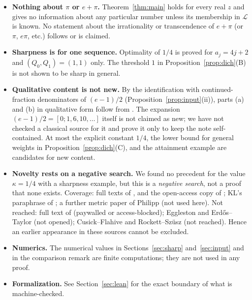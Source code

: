 \documentclass[11pt]{amsart}
\theoremstyle{remark}
\newcommand{\LL}{\mathcal{L}}
\begin{document}
\begin{itemize}
\item \textbf{Nothing about $\pi$ or $e+\pi$.} Theorem~\ref{thm:main} holds for every real $z$ and gives no
information about any particular number unless its membership in $\LL$ is known. No statement about
the irrationality or transcendence of $e+\pi$ (or $\pi$, $e\pi$, etc.) follows or is claimed.
\item \textbf{Sharpness is for one sequence.} Optimality of $1/4$ is proved for $a_j=4j+2$ and
$(Q_0,Q_1)=(1,1)$ only. The threshold $1$ in Proposition~\ref{prop:dich}(B) is not shown to be sharp in general.
\item \textbf{Qualitative content is not new.} By the identification with continued-fraction
denominators of $(e-1)/2$ (Proposition~\ref{prop:input}(ii)), parts (a) and (b) in qualitative form follow
from \cite{KL}. The expansion $(e-1)/2=[0;1,6,10,\dots]$ itself is not claimed as new; we have not checked
a classical source for it and prove it only to keep the note self-contained. At most the explicit
constant $1/4$, the lower bound for general weights in Proposition~\ref{prop:dich}(C), and the attainment
example are candidates for new content.
\item \textbf{Novelty rests on a negative search.} We found no precedent for the value
$\kappa=1/4$ with a sharpness example, but this is a \emph{negative search}, not a proof that none exists.
Coverage: full texts of \cite{KL}, \cite{Larcher} and the open-access copy of \cite{BDS}; KL's paraphrase
of \cite{Stewart}; a further metric paper of Philipp (not used here). Not reached: full text of
\cite{Stewart} (paywalled or access-blocked); Eggleston and Erd\H{o}s--Taylor (not opened);
Cusick--Flahive and Rockett--Sz\"usz (not reached). Hence an earlier appearance in these sources
cannot be excluded.
\item \textbf{Numerics.} The numerical values in Sections~\ref{sec:sharp} and~\ref{sec:input} and in the
comparison remark are finite computations; they are not used in any proof.
\item \textbf{Formalization.} See Section~\ref{sec:lean} for the exact boundary of what is machine-checked.
\end{itemize}

\end{document}

